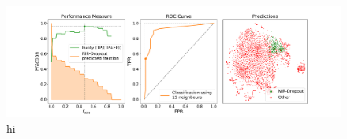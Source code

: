 \begin{figure}[h!]
    \centering %
    \includegraphics[trim={3.5cm 0cm 4.5cm 0cm},clip,width=\textwidth]{Code/Saved_Figures/Classification_plot.pdf}
    \caption{hi}
    \label{classification_plot}
\end{figure}